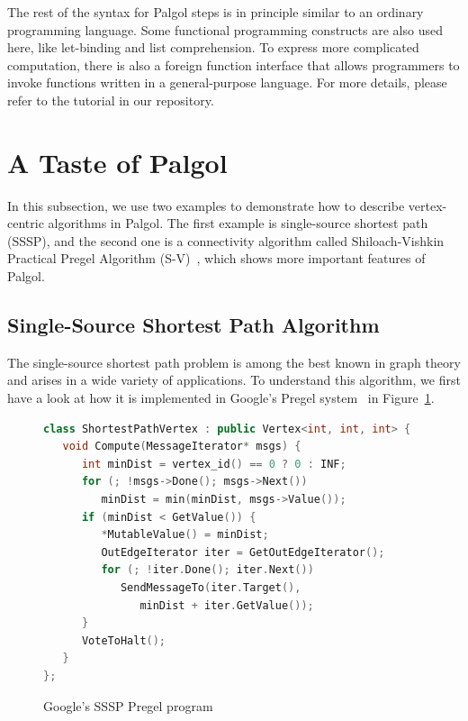 \documentclass{sokendai_thesis} %
\begin{document}
The rest of the syntax for Palgol steps is in principle similar to an ordinary programming language.
Some functional programming constructs are also used here, like let-binding and list comprehension.
To express more complicated computation, there is also a foreign function interface that allows programmers to invoke functions written in a general-purpose language.
For more details, please refer to the tutorial in our repository.

\section{A Taste of Palgol}
\label{sec:taste}

In this subsection, we use two examples to demonstrate how to describe vertex-centric algorithms in Palgol.
The first example is single-source shortest path (SSSP), and the second one is a connectivity algorithm called Shiloach-Vishkin Practical Pregel Algorithm (S-V)~\cite{connectivity}, which shows more important features of Palgol.

\subsection{Single-Source Shortest Path Algorithm}
\label{sec:sssp}

The single-source shortest path problem is among the best known in graph theory and arises in a wide variety of applications.
To understand this algorithm, we first have a look at how it is implemented in Google's Pregel system~\cite{pregel} in Figure~\ref{fig:sssp-pregel}.
\begin{figure}[thp]
\vspace{-2ex}
\begin{lstlisting}[basicstyle=\small\ttfamily,
numbers=none,language=c++,xleftmargin=0.1\textwidth]
class ShortestPathVertex : public Vertex<int, int, int> {
   void Compute(MessageIterator* msgs) {
      int minDist = vertex_id() == 0 ? 0 : INF;
      for (; !msgs->Done(); msgs->Next())
         minDist = min(minDist, msgs->Value());
      if (minDist < GetValue()) {
         *MutableValue() = minDist;
         OutEdgeIterator iter = GetOutEdgeIterator();
         for (; !iter.Done(); iter.Next())
            SendMessageTo(iter.Target(),
               minDist + iter.GetValue());
      }
      VoteToHalt();
   }
};
\end{lstlisting}
\vspace{-2ex}
\caption{Google's SSSP Pregel program~\protect\cite{pregel}}
\label{fig:sssp-pregel}
\end{figure}
\end{document}
